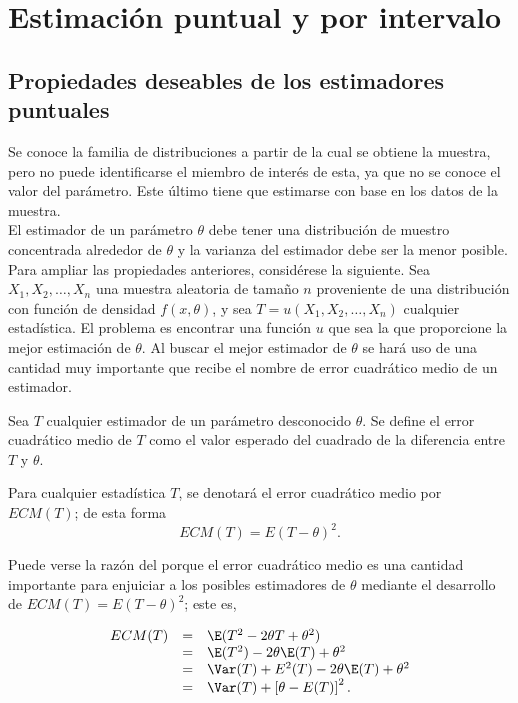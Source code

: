 \chapter{Estimación puntual y por intervalo}

\setcounter{section}{1}
\section{Propiedades deseables de los estimadores puntuales}

Se conoce la familia de distribuciones a partir de la cual se obtiene la muestra, pero no puede identificarse el miembro de interés de esta, ya que no se conoce el valor del parámetro. Este último tiene que estimarse con base en los datos de la muestra. \\

El estimador de un parámetro $\theta$ debe tener una distribución de muestro concentrada alrededor de $\theta$ y la varianza del estimador debe ser la menor posible. Para ampliar las propiedades anteriores, considérese la siguiente. Sea $X_1,X_2,\ldots,X_n$ una muestra aleatoria de tamaño $n$ proveniente de una distribución con función de densidad $f(x,\theta)$, y sea $T=u(X_1,X_2,\ldots,X_n)$ cualquier estadística. El problema es encontrar una función $u$ que sea la que proporcione la mejor estimación de $\theta$. Al buscar el mejor estimador de $\theta$ se hará uso de una cantidad muy importante que recibe el nombre de error cuadrático medio de un estimador.

\begin{def.}
    Sea $T$ cualquier estimador de un parámetro desconocido $\theta$. Se define el error cuadrático medio de $T$ como el valor esperado del cuadrado de la diferencia entre $T$ y $\theta$.
\end{def.}

Para cualquier estadística $T$, se denotará el error cuadrático medio por $ECM(T)$; de esta forma
$$ECM(T)=E(T-\theta)^2.$$

Puede verse la razón del porque el error cuadrático medio es una cantidad importante para enjuiciar a los posibles estimadores de $\theta$ mediante el desarrollo de $ECM(T)=E(T-\theta)^2$; este es,

$$
\begin{array}{rcl}
    ECM(T) &=& \E(T^2-2\theta T+\theta^2)\\
	   &=& \E(T^2)-2\theta\E(T)+\theta^2\\
	   &=& \Var(T)+E^2(T)-2\theta\E(T)+\theta^2\\
	   &=& \Var(T)+\left[\theta-E(T)\right]^2.
\end{array}
$$

